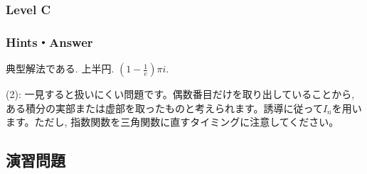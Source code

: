 \subsubsection{Level C}


\subsubsection{Hints・Answer}
{\small
\begin{probans}
典型解法である. 上半円. $(1-\frac{1}{e})\pi i$.
\end{probans}

\begin{probans} %
(2): 一見すると扱いにくい問題です。偶数番目だけを取り出していることから, ある積分の実部または虚部を取ったものと考えられます。誘導に従って$I_n$を用います。ただし, 指数関数を三角関数に直すタイミングに注意してください。
\end{probans}
}

\newpage



\subsection{演習問題}
